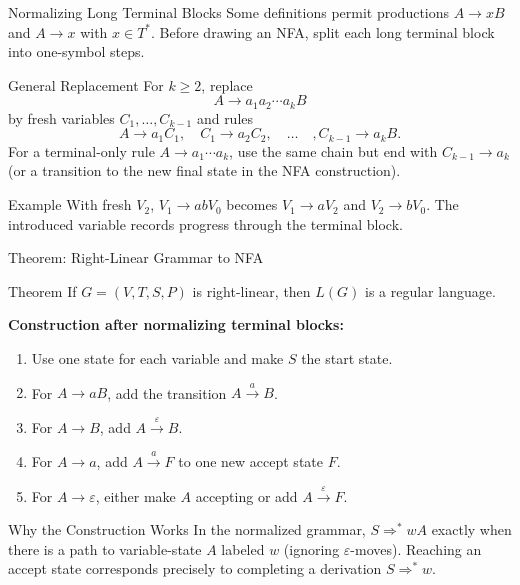 \documentclass[10pt]{beamer}
\begin{document}
\begin{frame}{Normalizing Long Terminal Blocks}
  Some definitions permit productions $A\rightarrow xB$ and $A\rightarrow x$
  with $x\in T^*$. Before drawing an NFA, split each long terminal block into
  one-symbol steps.
  \pause
  \begin{block}{General Replacement}
    For $k\geq2$, replace
    \[
      A\rightarrow a_1a_2\cdots a_kB
    \]
    by fresh variables $C_1,\ldots,C_{k-1}$ and rules
    \[
      A\rightarrow a_1C_1,\quad
      C_1\rightarrow a_2C_2,\quad\ldots\quad,
      C_{k-1}\rightarrow a_kB.
    \]
    For a terminal-only rule $A\rightarrow a_1\cdots a_k$, use the same chain
    but end with $C_{k-1}\rightarrow a_k$ (or a transition to the new final
    state in the NFA construction).
  \end{block}
  \pause
  \begin{exampleblock}{Example}
    With fresh $V_2$, $V_1\rightarrow abV_0$ becomes
    $V_1\rightarrow aV_2$ and $V_2\rightarrow bV_0$.
    The introduced variable records progress through the terminal block.
  \end{exampleblock}
\end{frame}

\begin{frame}{Theorem: Right-Linear Grammar to NFA}
  \small
  \begin{block}{Theorem}
    If $G=(V,T,S,P)$ is right-linear, then $L(G)$ is a regular language.
  \end{block}
  \pause
  \textbf{Construction after normalizing terminal blocks:}
  \begin{enumerate}
    \item Use one state for each variable and make $S$ the start state.
    \item For $A\rightarrow aB$, add the transition $A\xrightarrow{a}B$.
    \item For $A\rightarrow B$, add $A\xrightarrow{\varepsilon}B$.
    \item For $A\rightarrow a$, add $A\xrightarrow{a}F$ to one new accept
      state $F$.
    \item For $A\rightarrow\varepsilon$, either make $A$ accepting or add
      $A\xrightarrow{\varepsilon}F$.
  \end{enumerate}
  \pause
  \begin{exampleblock}{Why the Construction Works}
    In the normalized grammar, $S\Rightarrow^*wA$ exactly when there is a
    path to variable-state $A$ labeled $w$ (ignoring $\varepsilon$-moves).
    Reaching an accept state corresponds precisely to
    completing a derivation $S\Rightarrow^*w$.
  \end{exampleblock}
\end{frame}
\end{document}
